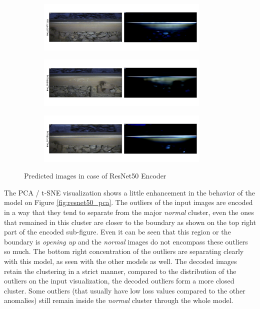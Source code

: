 \begin{figure}[!ht]
    \centering
    \begin{subfigure}{\textwidth}
        \centering
        \includegraphics[width=0.9\textwidth,trim={0 1cm 0 1cm},clip]{./results/resnet50_vgg19/20230514_213740_predict_0.png}
    \end{subfigure}
    \begin{subfigure}{\textwidth}
        \centering
        \includegraphics[width=0.9\textwidth,trim={0 1cm 0 1cm},clip]{./results/resnet50_vgg19/20230514_213740_predict_1.png}
    \end{subfigure}
    \begin{subfigure}{\textwidth}
        \centering
        \includegraphics[width=0.9\textwidth,trim={0 1cm 0 1cm},clip]{./results/resnet50_vgg19/20230514_213740_predict_2.png}
    \end{subfigure}
    \caption{Predicted images in case of ResNet50 Encoder}
    \label{fig:resnet50_examples}
\end{figure}

The PCA / t-SNE visualization shows a little enhancement in the behavior of the model
on Figure \ref{fig:resnet50_pca}.
The outliers of the input images are encoded in a way that they tend to separate from the
major \emph{normal} cluster, even the ones that remained in this cluster are closer to the boundary
as shown on the top right part of the encoded sub-figure.
Even it can be seen that this region or the boundary is \emph{opening up} and the \emph{normal}
images do not encompass these outliers so much.
The bottom right concentration of the outliers are separating clearly with this model,
as seen with the other models as well.
The decoded images retain the clustering in a strict manner, compared to the distribution of the
outliers on the input visualization, the decoded outliers form a more closed cluster.
Some outliers (that usually have low loss values compared to the other anomalies) still
remain inside the \emph{normal} cluster through the whole model.

